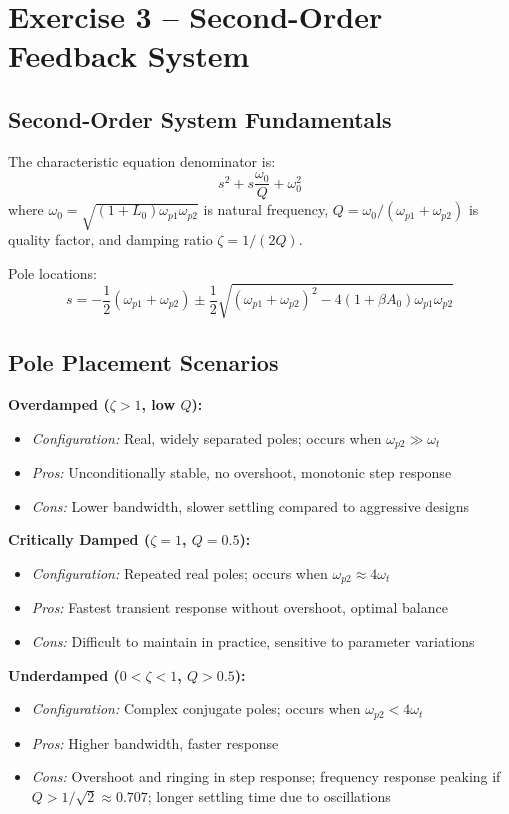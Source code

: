 \documentclass[main.tex]{subfiles}
\begin{document}
\section{Exercise 3 – Second-Order Feedback System}

\subsection*{Second-Order System Fundamentals}

The characteristic equation denominator is:
$$s^2 + s\frac{\omega_0}{Q} + \omega_0^2$$
where $\omega_0 = \sqrt{(1+L_0)\omega_{p1}\omega_{p2}}$ is natural frequency, $Q = \omega_0/(\omega_{p1}+\omega_{p2})$ is quality factor, and damping ratio $\zeta = 1/(2Q)$.

Pole locations:
$$s = -\frac{1}{2}(\omega_{p1}+\omega_{p2}) \pm \frac{1}{2}\sqrt{(\omega_{p1}+\omega_{p2})^2 - 4(1+\beta A_0)\omega_{p1}\omega_{p2}}$$

\subsection*{Pole Placement Scenarios}

\textbf{Overdamped ($\zeta > 1$, low $Q$):}
\begin{itemize}
    \item \textit{Configuration:} Real, widely separated poles; occurs when $\omega_{p2} \gg \omega_t$
    \item \textit{Pros:} Unconditionally stable, no overshoot, monotonic step response
    \item \textit{Cons:} Lower bandwidth, slower settling compared to aggressive designs
\end{itemize}

\textbf{Critically Damped ($\zeta = 1$, $Q = 0.5$):}
\begin{itemize}
    \item \textit{Configuration:} Repeated real poles; occurs when $\omega_{p2} \approx 4\omega_t$
    \item \textit{Pros:} Fastest transient response without overshoot, optimal balance
    \item \textit{Cons:} Difficult to maintain in practice, sensitive to parameter variations
\end{itemize}

\textbf{Underdamped ($0 < \zeta < 1$, $Q > 0.5$):}
\begin{itemize}
    \item \textit{Configuration:} Complex conjugate poles; occurs when $\omega_{p2} < 4\omega_t$
    \item \textit{Pros:} Higher bandwidth, faster response
    \item \textit{Cons:} Overshoot and ringing in step response; frequency response peaking if $Q > 1/\sqrt{2} \approx 0.707$; longer settling time due to oscillations
\end{itemize}
\end{document}
